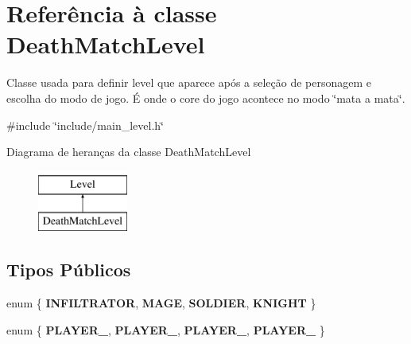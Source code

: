 \hypertarget{classDeathMatchLevel}{}\section{Referência à classe Death\+Match\+Level}
\label{classDeathMatchLevel}


Classe usada para definir level que aparece após a seleção de personagem e escolha do modo de jogo. É onde o core do jogo acontece no modo \char`\"{}mata a mata\char`\"{}.  




{\ttfamily \#include \char`\"{}include/main\+\_\+level.\+h\char`\"{}}

Diagrama de heranças da classe Death\+Match\+Level\begin{figure}[H]
\begin{center}
\leavevmode
\includegraphics[height=2.000000cm]{classDeathMatchLevel}
\end{center}
\end{figure}
\subsection*{Tipos Públicos}
\begin{DoxyCompactItemize}
\item 
\mbox{\label{classDeathMatchLevel_a83b463b0db852f3ec9ef87bf89c1fdd2}} 
enum \{ {\bfseries I\+N\+F\+I\+L\+T\+R\+A\+T\+OR}, 
{\bfseries M\+A\+GE}, 
{\bfseries S\+O\+L\+D\+I\+ER}, 
{\bfseries K\+N\+I\+G\+HT}
 \}
\item 
\mbox{\label{classDeathMatchLevel_a3940c33316209aaba9d88e24fec09bfc}} 
enum \{ {\bfseries P\+L\+A\+Y\+E\+R\+\_}, 
{\bfseries P\+L\+A\+Y\+E\+R\+\_}, 
{\bfseries P\+L\+A\+Y\+E\+R\+\_}, 
{\bfseries P\+L\+A\+Y\+E\+R\+\_}
 \}
\end{DoxyCompactItemize}
